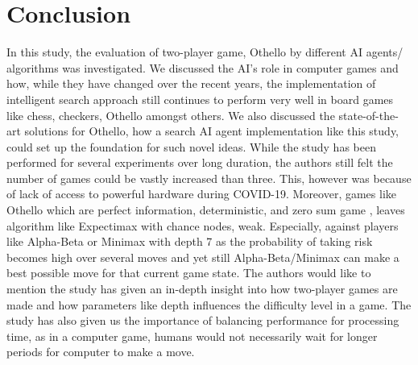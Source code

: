 \documentclass{svproc}
\begin{document}
\section{Conclusion}\label{5}

In this study, the evaluation of two-player game, Othello by different AI agents/ algorithms was investigated. We discussed the AI's role in computer games and how, while they have changed over the recent years, the implementation of intelligent search approach still continues to perform very well in board games like chess, checkers, Othello amongst others. We also discussed the state-of-the-art solutions for Othello, how a search AI agent implementation like this study, could set up the foundation for such novel ideas.
While the study has been performed for several experiments over long duration, the authors still felt the number of games could be vastly increased than three. This, however was because of lack of access to powerful hardware during COVID-19. Moreover, games like Othello which are perfect information, deterministic, and zero sum game , leaves algorithm like Expectimax with chance nodes, weak. Especially, against players like Alpha-Beta or Minimax with depth 7 as the probability of taking risk becomes high over several moves and yet still Alpha-Beta/Minimax can make a best possible move for that current game state.
The authors would like to mention the study has given an in-depth insight into how two-player games are made and how parameters like depth influences the difficulty level in a game. The study has also given us the importance of balancing performance for processing time, as in a computer game, humans would not necessarily wait for longer periods for computer to make a move.
\end{document}
